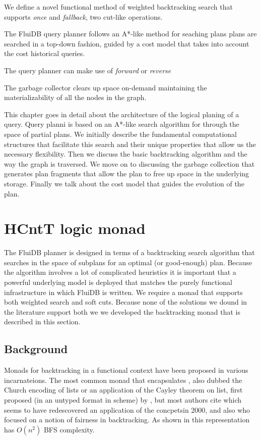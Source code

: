 \begin{summary}
\item We define a novel functional method of weighted backtracking search
  that supports \emph{once} and \emph{fallback}, two cut-like operations.
\item The FluiDB query planner follows an A*-like method for seaching plans
  plans are searched in a top-down fashion, guided by a cost model that
  takes into account the cost historical queries.
\item The query planner can make use of \emph{forward} or \emph{reverse}
\item The garbage collector clears up space on-demand maintaining the materializability
  of all the nodes in the graph.
\end{summary}

This chapter goes in detail about the architecture of the logical
planing of a query. Query planni is based on an A*-like search
algorithm for through the space of partial plans. We initially
describe the fundamental computational structures that facilitate this
search and their unique properties that allow us the necessary
flexibility. Then we discuss the basic backtracking algorithm and the
way the graph is traversed. We move on to discussing the garbage
collection that generates plan fragments that allow the plan to free
up space in the underlying storage. Finally we talk about the cost
model that guides the evolution of the plan.
\section{HCntT logic monad}

The FluiDB planner is designed in terms of a backtracking search
algorithm that searches in the space of subplans for an optimal (or
good-enough) plan. Because the algorithm involves a lot of complicated
heuristics it is important that a powerful underlying model is
deployed that matches the purely functional infrastructure in which
FluiDB is written.  We require a monad that supports both weighted
search and soft cuts. Because none of the solutions we dound in the
literature support both we we developed the  backtracking monad
that is described in this section.

\subsection{Background}

Monads for backtracking in a functional context have been proposed in
various incarnateions.  The most common monad that encapsulates
, also
dubbed the Church encoding of lists or an application of the Cayley
theorem on list, first proposed (in an untyped format in scheme) by
\cite{haynesLogicContinuations1987}, but most authors cite
\cite{hinzeDerivingBacktrackingMonad2000a} which seems to have
redescovered an application of the concpetsin 2000, and also
\cite{kiselyovBacktrackingInterleavingTerminating} who focused on a
notion of fairness in backtracking. As shown in
\cite{kidneyAlgebrasWeightedSearch2021} this representation has
\(O(n^2)\) BFS complexity.

